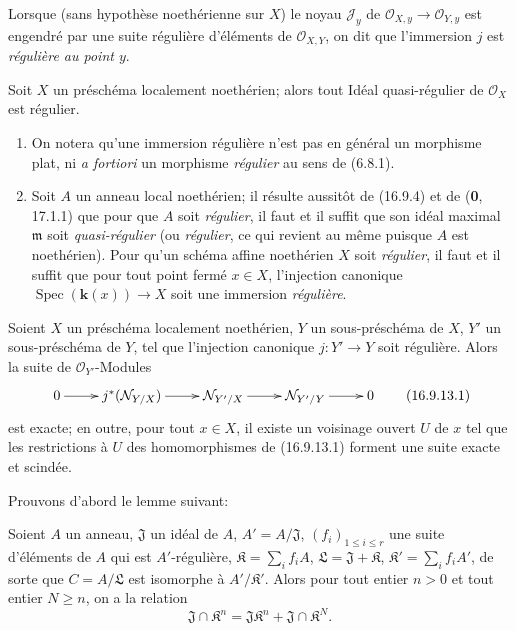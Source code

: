 Lorsque (sans hypothèse noethérienne sur $X$) le noyau $\mathscr{J}_y$ de
$\mathcal{O}_{X,y}\to\mathcal{O}_{Y,y}$ est engendré par une suite régulière
d'éléments de $\mathcal{O}_{X,Y}$, on dit que l'immersion $j$ est
\emph{régulière au point $y$}.

\begin{corollary}[16.9.11]
\label{IV.16.9.11}
Soit $X$ un préschéma localement noethérien; alors tout Idéal quasi-régulier de
$\mathcal{O}_X$ est régulier.
\end{corollary}

\begin{remarks}[16.9.12]
\label{IV.16.9.12}
\begin{enumerate}
  \item[(i)] On notera qu'une immersion régulière n'est pas en général un
  morphisme plat, ni \emph{a fortiori} un morphisme \emph{régulier} au sens de
  (6.8.1).
  \item[(ii)] Soit $A$ un anneau local noethérien; il résulte aussitôt de
  (16.9.4) et de (\textbf{0}, 17.1.1) que pour que $A$ soit \emph{régulier}, il faut et
  il suffit que son idéal maximal $\mathfrak{m}$ soit \emph{quasi-régulier}
  (ou \emph{régulier}, ce qui revient au même puisque $A$ est noethérien).
  Pour qu'un schéma affine noethérien $X$ soit \emph{régulier}, il faut et il
  suffit que pour tout point fermé $x\in X$, l'injection canonique
  $\operatorname{Spec}(\boldsymbol{k}(x))\to X$ soit une immersion \emph{régulière}.
\end{enumerate}
\end{remarks}

\begin{proposition}[16.9.13]
\label{IV.16.9.13}
Soient $X$ un préschéma localement noethérien, $Y$ un sous-préschéma de $X$,
$Y'$ un sous-préschéma de $Y$, tel que l'injection canonique $j:Y'\to Y$ soit
régulière. Alors la suite de $\mathcal{O}_{Y'}$-Modules
\[
  \xymatrix{
    0\ar[r] & j^*(\mathcal{N}_{Y/X})\ar[r]
      & \mathcal{N}_{Y'/X}\ar[r] & \mathcal{N}_{Y'/Y}\ar[r] & 0
  }
  \tag{16.9.13.1}
  \label{IV.16.9.13.1}
\]
est exacte; en outre, pour tout $x\in X$, il existe un voisinage ouvert $U$
de $x$ tel que les restrictions à $U$ des homomorphismes de \textup{(16.9.13.1)}
forment une suite exacte et scindée.
\end{proposition}

Prouvons d'abord le lemme suivant:

\begin{lemma}[16.9.13.2]
\label{IV.16.9.13.2}
Soient $A$ un anneau, $\mathfrak{J}$ un idéal de $A$,
$A'=A/\mathfrak{J}$, $(f_i)_{1\leq i\leq r}$ une suite d'éléments de $A$ qui
est $A'$-régulière, $\mathfrak{K}=\sum_i f_iA$,
$\mathfrak{L}=\mathfrak{J}+\mathfrak{K}$,
$\mathfrak{K}'=\sum_i f_iA'$, de sorte que $C=A/\mathfrak{L}$ est isomorphe à
$A'/\mathfrak{K}'$. Alors pour tout entier $n>0$ et tout entier $N\geq n$,
on a la relation
\[
  \mathfrak{J}\cap\mathfrak{K}^n
  =\mathfrak{J}\mathfrak{K}^n+\mathfrak{J}\cap\mathfrak{K}^N.
  \tag{16.9.13.3}
  \label{IV.16.9.13.3}
\]
\end{lemma}

